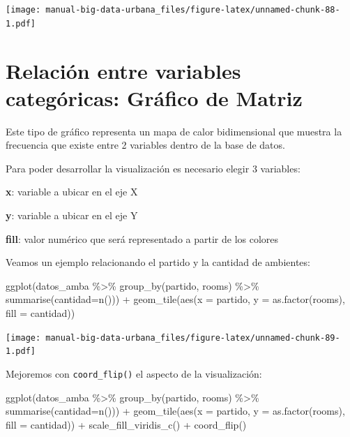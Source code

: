 \documentclass[
  spanish,
]{book}
\newenvironment{Shaded}{\begin{snugshade}}{\end{snugshade}}
\newcommand{\AttributeTok}[1]{\textcolor[rgb]{0.77,0.63,0.00}{#1}}
\newcommand{\FunctionTok}[1]{\textcolor[rgb]{0.00,0.00,0.00}{#1}}
\newcommand{\NormalTok}[1]{#1}
\newcommand{\SpecialCharTok}[1]{\textcolor[rgb]{0.00,0.00,0.00}{#1}}
\begin{document}
\texttt{[image: manual-big-data-urbana\_files/figure-latex/unnamed-chunk-88-1.pdf]}

\hypertarget{relaciuxf3n-entre-variables-categuxf3ricas-gruxe1fico-de-matriz}{%
\section{Relación entre variables categóricas: Gráfico de Matriz}\label{relaciuxf3n-entre-variables-categuxf3ricas-gruxe1fico-de-matriz}}

Este tipo de gráfico representa un mapa de calor bidimensional que muestra la frecuencia que existe entre 2 variables dentro de la base de datos.

Para poder desarrollar la visualización es necesario elegir 3 variables:

\textbf{x}: variable a ubicar en el eje X

\textbf{y}: variable a ubicar en el eje Y

\textbf{fill}: valor numérico que será representado a partir de los colores

Veamos un ejemplo relacionando el partido y la cantidad de ambientes:

\begin{Shaded}
\begin{Highlighting}[]
\FunctionTok{ggplot}\NormalTok{(datos\_amba }\SpecialCharTok{\%\textgreater{}\%}
              \FunctionTok{group\_by}\NormalTok{(partido, rooms) }\SpecialCharTok{\%\textgreater{}\%}
              \FunctionTok{summarise}\NormalTok{(}\AttributeTok{cantidad=}\FunctionTok{n}\NormalTok{())) }\SpecialCharTok{+} 
  \FunctionTok{geom\_tile}\NormalTok{(}\FunctionTok{aes}\NormalTok{(}\AttributeTok{x =}\NormalTok{ partido,}
                \AttributeTok{y =} \FunctionTok{as.factor}\NormalTok{(rooms),}
                \AttributeTok{fill =}\NormalTok{ cantidad))}
\end{Highlighting}
\end{Shaded}

\texttt{[image: manual-big-data-urbana\_files/figure-latex/unnamed-chunk-89-1.pdf]}

Mejoremos con \texttt{coord\_flip()} el aspecto de la visualización:

\begin{Shaded}
\begin{Highlighting}[]
\FunctionTok{ggplot}\NormalTok{(datos\_amba }\SpecialCharTok{\%\textgreater{}\%}
              \FunctionTok{group\_by}\NormalTok{(partido, rooms) }\SpecialCharTok{\%\textgreater{}\%}
              \FunctionTok{summarise}\NormalTok{(}\AttributeTok{cantidad=}\FunctionTok{n}\NormalTok{())) }\SpecialCharTok{+} 
  \FunctionTok{geom\_tile}\NormalTok{(}\FunctionTok{aes}\NormalTok{(}\AttributeTok{x =}\NormalTok{ partido,}
                \AttributeTok{y =} \FunctionTok{as.factor}\NormalTok{(rooms),}
                \AttributeTok{fill =}\NormalTok{ cantidad)) }\SpecialCharTok{+}
  \FunctionTok{scale\_fill\_viridis\_c}\NormalTok{() }\SpecialCharTok{+}
  \FunctionTok{coord\_flip}\NormalTok{()}
\end{Highlighting}
\end{Shaded}
\end{document}
